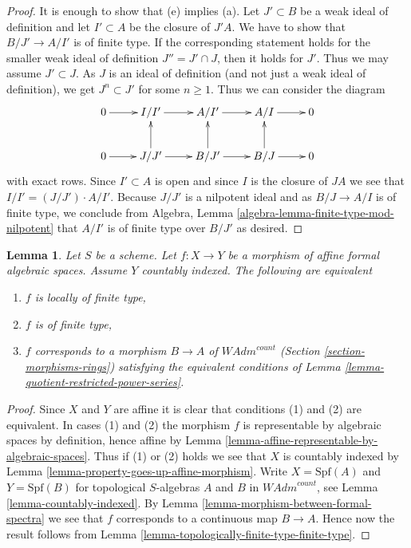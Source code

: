 \documentclass{stacks-project}
\theoremstyle{plain}
\newtheorem{lemma}[subsection]{Lemma}
\theoremstyle{definition}
\theoremstyle{remark}
\numberwithin{equation}{subsection}
\begin{document}
\begin{proof}
It is enough to show that (e) implies (a). Let $J' \subset B$ be a weak ideal
of definition and let $I' \subset A$ be the closure of $J'A$. We have
to show that $B/J' \to A/I'$ is of finite type. If the corresponding statement
holds for the smaller weak ideal of definition $J'' = J' \cap J$, then it
holds for $J'$. Thus we may assume $J' \subset J$. As $J$ is an ideal
of definition (and not just a weak ideal of definition), we get
$J^n \subset J'$ for some $n \geq 1$. Thus we can consider the
diagram
$$
\xymatrix{
0 \ar[r] & I/I' \ar[r] & A/I' \ar[r] & A/I \ar[r] & 0 \\
0 \ar[r] & J/J' \ar[r] \ar[u] & B/J' \ar[r] \ar[u] & B/J \ar[r] \ar[u] & 0
}
$$
with exact rows. Since $I' \subset A$ is open and since
$I$ is the closure of $J A$ we see that $I/I' = (J/J') \cdot A/I'$.
Because $J/J'$ is a nilpotent ideal and as $B/J \to A/I$ is of finite type,
we conclude from Algebra, Lemma \ref{algebra-lemma-finite-type-mod-nilpotent}
that $A/I'$ is of finite type over $B/J'$ as desired.
\end{proof}

\begin{lemma}
\label{lemma-representable-affine-finite-type}
Let $S$ be a scheme. Let $f : X \to Y$ be a morphism of
affine formal algebraic spaces. Assume $Y$ countably indexed.
The following are equivalent
\begin{enumerate}
\item $f$ is locally of finite type,
\item $f$ is of finite type,
\item $f$ corresponds to a morphism $B \to A$ of $\textit{WAdm}^{count}$
(Section \ref{section-morphisms-rings})
satisfying the equivalent conditions of
Lemma \ref{lemma-quotient-restricted-power-series}.
\end{enumerate}
\end{lemma}

\begin{proof}
Since $X$ and $Y$ are affine it is clear that conditions (1)
and (2) are equivalent. In cases (1) and (2) the morphism $f$
is representable by algebraic spaces by definition, hence
affine by Lemma \ref{lemma-affine-representable-by-algebraic-spaces}.
Thus if (1) or (2) holds we see that
$X$ is countably indexed by
Lemma \ref{lemma-property-goes-up-affine-morphism}.
Write $X = \text{Spf}(A)$ and $Y = \text{Spf}(B)$
for topological $S$-algebras $A$ and $B$ in $\textit{WAdm}^{count}$, see
Lemma \ref{lemma-countably-indexed}. By
Lemma \ref{lemma-morphism-between-formal-spectra}
we see that $f$ corresponds to a continuous map $B \to A$.
Hence now the result follows from
Lemma \ref{lemma-topologically-finite-type-finite-type}.
\end{proof}
\end{document}
